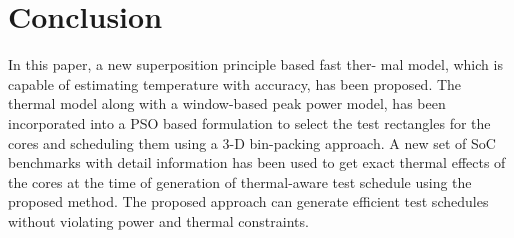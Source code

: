 \documentclass[conference]{IEEEtran}
\begin{document}
\section{Conclusion}
\label{sec: 5}
In this paper, a new superposition principle based fast ther-
mal model, which is capable of estimating temperature with
accuracy, has been proposed. The thermal model along with a
window-based peak power model, has been incorporated into
a PSO based formulation to select the test rectangles for the
cores and scheduling them using a 3-D bin-packing approach.
A new set of SoC benchmarks with detail information has been
used to get exact thermal effects of the cores at the time of
generation of thermal-aware test schedule using the proposed
method. The proposed approach can generate efficient test
schedules without violating power and thermal constraints.

 

\end{document}
